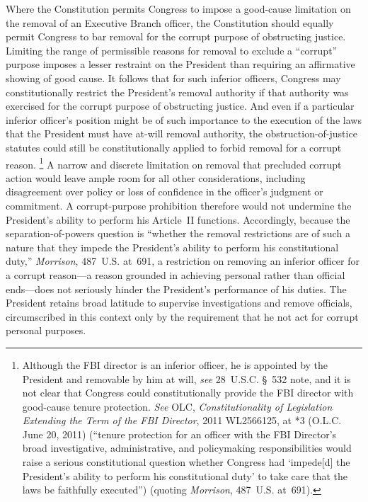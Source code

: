Where the Constitution permits Congress to impose a good-cause limitation on the removal of an Executive Branch officer, the Constitution should equally permit Congress to bar removal for the corrupt purpose of obstructing justice.
Limiting the range of permissible reasons for removal to exclude a ``corrupt'' purpose imposes a lesser restraint on the President than requiring an affirmative showing of good cause.
It follows that for such inferior officers, Congress may constitutionally restrict the President's removal authority if that authority was exercised for the corrupt purpose of obstructing justice.
And even if a particular inferior officer's position might be of such importance to the execution of the laws that the President must have at-will removal authority, the obstruction-of-justice statutes could still be constitutionally applied to forbid removal for a corrupt reason.%
\footnote{Although the FBI director is an inferior officer, he is appointed by the President and removable by him at will, \textit{see} 28~U.S.C. \S~532 note, and it is not clear that Congress could constitutionally provide the FBI director with good-cause tenure protection.
\textit{See} OLC, \textit{Constitutionality of Legislation Extending the Term of the FBI Director}, 2011 WL2566125, at *3 (O.L.C. June 20, 2011) (``tenure protection for an officer with the FBI Director's broad investigative, administrative, and policymaking responsibilities would raise a serious constitutional question whether Congress had `impede[d] the President's ability to perform his constitutional duty' to take care that the laws be faithfully executed'') (quoting \textit{Morrison}, 487~U.S. at~691).}
A narrow and discrete limitation on removal that precluded corrupt action would leave ample room for all other considerations, including disagreement over policy or loss of confidence in the officer's judgment or commitment.
A corrupt-purpose prohibition therefore would not undermine the President's ability to perform his Article~II functions.
Accordingly, because the separation-of-powers question is ``whether the removal restrictions are of such a nature that they impede the President's ability to perform his constitutional duty,'' \textit{Morrison}, 487~U.S. at~691, a restriction on removing an inferior officer for a corrupt reason---a reason grounded in achieving personal rather than official ends---does not seriously hinder the President's performance of his duties.
The President retains broad latitude to supervise investigations and remove officials, circumscribed in this context only by the requirement that he not act for corrupt personal purposes.%
